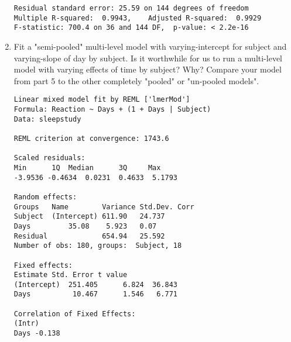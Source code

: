 \documentclass[12pt,letterpaper]{article}
\begin{document}
\begin{enumerate}
\begin{Verbatim}
Residual standard error: 25.59 on 144 degrees of freedom
Multiple R-squared:  0.9943,	Adjusted R-squared:  0.9929 
F-statistic: 700.4 on 36 and 144 DF,  p-value: < 2.2e-16
\end{Verbatim}
	\item Fit a "semi-pooled" multi-level model with varying-intercept for subject and varying-slope of day by subject. Is it worthwhile for us to run a multi-level model with varying effects of time by subject? Why? Compare your model from part 5 to the other completely "pooled" or "un-pooled models".
	
\begin{Verbatim}
Linear mixed model fit by REML ['lmerMod']
Formula: Reaction ~ Days + (1 + Days | Subject)
Data: sleepstudy

REML criterion at convergence: 1743.6

Scaled residuals: 
Min      1Q  Median      3Q     Max 
-3.9536 -0.4634  0.0231  0.4633  5.1793 

Random effects:
Groups   Name        Variance Std.Dev. Corr
Subject  (Intercept) 611.90   24.737       
Days         35.08    5.923   0.07
Residual             654.94   25.592       
Number of obs: 180, groups:  Subject, 18

Fixed effects:
Estimate Std. Error t value
(Intercept)  251.405      6.824  36.843
Days          10.467      1.546   6.771

Correlation of Fixed Effects:
(Intr)
Days -0.138
\end{Verbatim}
\end{enumerate}
\end{document}
